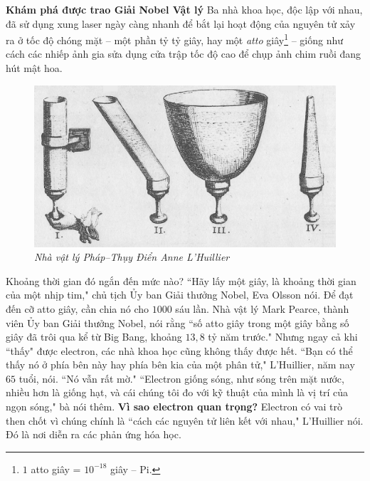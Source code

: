 \begin{multicols}{2}
	\vskip 0.1cm
	\textbf{\color{timhieukhoahoc}Khám phá được trao Giải Nobel Vật lý}
	\vskip 0.1cm
	Ba nhà khoa học, độc lập với nhau, đã sử dụng xung laser ngày càng nhanh để bắt lại hoạt động của nguyên tử xảy ra ở tốc độ chóng mặt -- một phần tỷ tỷ giây, hay một \textit{atto} giây\footnote[3]{\color{timhieukhoahoc}$1$ atto giây = $10^{-18}$ giây -- Pi.} -- giống như cách các nhiếp ảnh gia sửa dụng cửa trập tốc độ cao để chụp ảnh chim ruồi đang hút mật hoa.
	\begin{figure}[H]
		\vspace*{5pt}
		\centering
		\captionsetup{labelformat= empty, justification=centering}
		\includegraphics[width= 1\linewidth]{3}
		\caption{\small\textit{\color{timhieukhoahoc}Nhà vật lý Pháp--Thụy Điển Anne L'Huillier}}
		\vspace*{-10pt}
	\end{figure}
	Khoảng thời gian đó ngắn đến mức nào?
	\vskip 0.1cm
	``Hãy lấy một giây, là khoảng thời gian của một nhịp tim," chủ tịch Ủy ban Giải thưởng Nobel, Eva Olsson nói. Để đạt đến cỡ atto giây, cần chia nó cho $1000$ sáu lần.
	\vskip 0.1cm
	Nhà vật lý Mark Pearce, thành viên Ủy ban Giải thưởng Nobel, nói rằng ``số atto giây trong một giây bằng số giây đã trôi qua kể từ Big Bang, khoảng $13{,}8$ tỷ năm trước."
	\vskip 0.1cm
	Nhưng ngay cả khi ``thấy" được electron, các nhà khoa học cũng không thấy được hết.
	\vskip 0.1cm
	``Bạn có thể thấy nó ở phía bên này hay phía bên kia của một phân tử," L'Huillier, năm nay $65$ tuổi, nói. ``Nó vẫn rất mờ."
	\vskip 0.1cm
	``Electron giống sóng, như sóng trên mặt nước, nhiều hơn là giống hạt, và cái chúng tôi đo với kỹ thuật của mình là vị trí của ngọn sóng," bà nói thêm.
	\vskip 0.1cm
	\textbf{\color{timhieukhoahoc}Vì sao electron quan trọng?}
	\vskip 0.1cm
	Electron có vai trò then chốt vì chúng chính là ``cách các nguyên tử liên kết với nhau," L'Huillier nói. Đó là nơi diễn ra các phản ứng hóa học.

\end{multicols}
